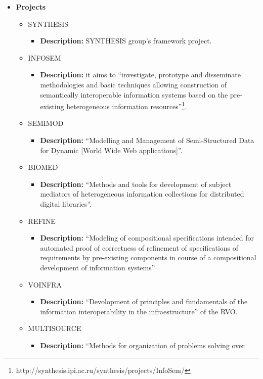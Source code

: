 \begin{itemize}
\item
\textbf{Projects}
\begin{itemize}
\item SYNTHESIS
\begin{itemize}
\item \textbf{Description:} SYNTHESIS group's framework project.
\end{itemize}
\item INFOSEM
\begin{itemize}
\item \textbf{Description:} it aims to ``investigate, prototype and disseminate
methodologies and basic techniques allowing construction of semantically
interoperable information systems based on the pre-existing heterogeneous
information
resources''\footnote{http://synthesis.ipi.ac.ru/synthesis/projects/InfoSem/}.
\end{itemize}
\item SEMIMOD
\begin{itemize}
\item \textbf{Description:} ``Modelling and Management of Semi-Structured Data
for Dynamic [World Wide Web applications]''.
\end{itemize}
\item BIOMED
\begin{itemize}
\item \textbf{Description:} ``Methods and tools for development of subject
mediators of he\-te\-ro\-ge\-neous information collections for distributed
digital libraries''.
\end{itemize}
\item REFINE
\begin{itemize}
\item \textbf{Description:} ``Modeling of compositional specifications intended
for automated proof of correctness of refinement of specifications of
requirements by pre-existing components in course of a compositional development
of information systems''.
\end{itemize}
\item VOINFRA
\begin{itemize}
\item \textbf{Description:} ``Devolopment of principles and fundamentals of the
information interoperability in the infraestructure'' of the RVO.
\end{itemize}
\item MULTISOURCE
\begin{itemize}
\item \textbf{Description:} ``Methods for organization of problems solving over

\end{itemize}
\end{itemize}
\end{itemize}

